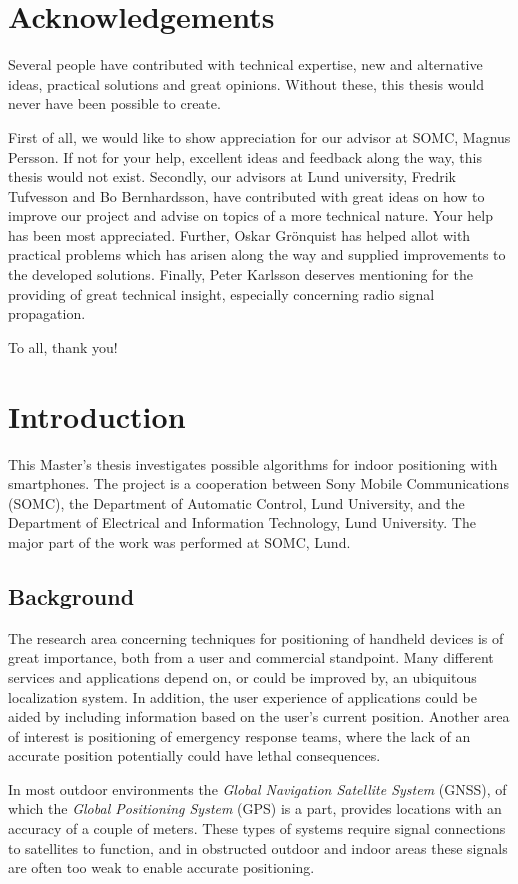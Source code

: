 \documentclass{LTHthesis}
\begin{document}
\chapter*{Acknowledgements}
Several people have contributed with technical expertise, new and alternative ideas, practical solutions and great opinions. Without these, this thesis would never have been possible to create. 

First of all, we would like to show appreciation for our advisor at SOMC, Magnus Persson. If not for your help, excellent ideas and feedback along the way, this thesis would not exist. Secondly, our advisors at Lund university, Fredrik Tufvesson and Bo Bernhardsson, have contributed with great ideas on how to improve our project and advise on topics of a more technical nature. Your help has been most appreciated. Further, Oskar Gr\"{o}nquist has helped allot with practical problems which has arisen along the way and supplied improvements to the developed solutions. Finally, Peter Karlsson deserves mentioning for the providing of great technical insight, especially concerning radio signal propagation.     

To all, thank you!
\tableofcontents
\chapter{Introduction}

This Master's thesis investigates possible algorithms for indoor positioning with smartphones. The project is a cooperation between Sony Mobile Communications (SOMC), the Department of Automatic Control, Lund University, and the Department of Electrical and Information Technology, Lund University. The major part of the work was performed at SOMC, Lund.

\section{Background}
%
The research area concerning techniques for positioning of handheld devices is of great importance, both from a user and commercial standpoint. Many different services and applications depend on, or could be improved by, an ubiquitous localization system. In addition, the user experience of applications could be aided by including information based on the user's current position. Another area of interest is positioning of emergency response teams, where the lack of an accurate position potentially could have lethal consequences.
  
In most outdoor environments the \emph{Global Navigation Satellite System} (GNSS), of which the \emph{Global Positioning System} (GPS) is a part, provides locations with an accuracy of a couple of meters. These types of systems require signal connections to satellites to function, and in obstructed outdoor and indoor areas these signals are often too weak to enable accurate positioning. 
\end{document}

